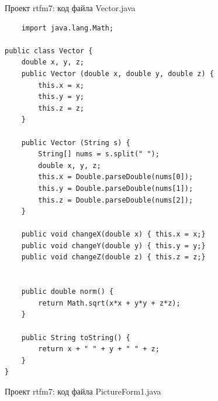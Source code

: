 \documentclass[a4paper, 14pt]{extarticle}
\begin{document}
\par
Проект rtfm7: код файла Vector.java
\begin{lstlisting}
    import java.lang.Math;

public class Vector {
    double x, y, z;
    public Vector (double x, double y, double z) {
        this.x = x;
        this.y = y;
        this.z = z;
    }

    public Vector (String s) {
        String[] nums = s.split(" ");
        double x, y, z;
        this.x = Double.parseDouble(nums[0]);
        this.y = Double.parseDouble(nums[1]);
        this.z = Double.parseDouble(nums[2]);
    }

    public void changeX(double x) { this.x = x;}
    public void changeY(double y) { this.y = y;}
    public void changeZ(double z) { this.z = z;}


    public double norm() {
        return Math.sqrt(x*x + y*y + z*z);
    }

    public String toString() {
        return x + " " + y + " " + z;
    }
}
\end{lstlisting}
\par
Проект rtfm7: код файла PictureForm1.java
\end{document}
